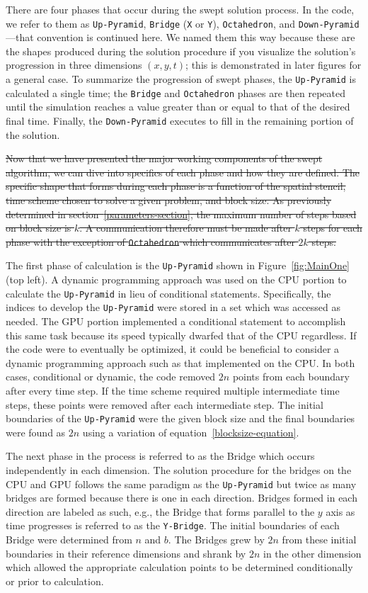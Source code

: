 \documentclass[mca,article,submit,moreauthors,pdftex]{Definitions/mdpi}
\newcommand{\former}[2]{\sloppy\cbcolor{#2}\textcolor{#2}{\cbdelete\sout{#1}}}
\def\Up{\texttt{Up-Pyramid}}
\def\Down{\texttt{Down-Pyramid}}
\def\Oct{\texttt{Octahedron}}
\def\Yb{\texttt{Y-Bridge}}
\begin{document}
\begin{paracol}{2}
There are four phases that occur during the swept solution process. In the code, we refer to them as \Up{}, \texttt{Bridge} (\texttt{X} or \texttt{Y}), \Oct{}, and \Down{}---that convention is continued here. We named them this way because these are the shapes produced during the solution procedure if you visualize the solution's progression in three dimensions $(x,y,t)$; this is demonstrated in later figures for a general case. To summarize the progression of swept phases, the \Up{} is calculated a single time; the \texttt{Bridge} and \Oct{} phases are then repeated until the simulation reaches a value greater than or equal to that of the desired final time. Finally, the \Down{} executes to fill in the remaining portion of the solution. 

\former{Now that we have presented the major working components of the swept algorithm, we can dive into specifics of each phase and how they are defined. The specific shape that forms during each phase is a function of the spatial stencil, time scheme chosen to solve a given problem, and block size. As previously determined in section~\ref{parameters-section}, the maximum number of steps based on block size is $k$. A communication therefore must be made after $k$ steps for each phase with the exception of \Oct{} which communicates after $2k$ steps.}{revTwo}
 
The first phase of calculation is the \Up{} shown in Figure~\ref{fig:MainOne} (top left). A dynamic programming approach was used on the CPU portion to calculate the \Up{} in lieu of conditional statements. Specifically, the indices to develop the \Up{} were stored in a set which was accessed as needed. The GPU portion implemented a conditional statement to accomplish this same task because its speed typically dwarfed that of the CPU regardless. If the code were to eventually be optimized, it could be beneficial to consider a dynamic programming approach such as that implemented on the CPU. In both cases, conditional or dynamic, the code removed $2n$ points from each boundary after every time step. If the time scheme required multiple intermediate time steps, these points were removed after each intermediate step. The initial boundaries of the \Up{} were the given block size and the final boundaries were found as $2n$ using a variation of equation~\ref{blocksize-equation}.

The next phase in the process is referred to as the Bridge which occurs independently in each dimension. The solution procedure for the bridges on the CPU and GPU follows the same paradigm as the \Up{} but twice as many bridges are formed because there is one in each direction. Bridges formed in each direction are labeled as such, e.g., the Bridge that forms parallel to the $y$ axis as time progresses is referred to as the \Yb{}. The initial boundaries of each Bridge were determined from $n$ and $b$. The Bridges grew by $2n$ from these initial boundaries in their reference dimensions and shrank by $2n$ in the other dimension which allowed the appropriate calculation points to be determined conditionally or prior to calculation.

\end{paracol}
\nointerlineskip
\end{document}
